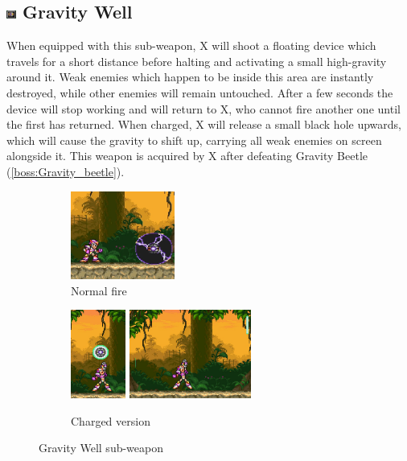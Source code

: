 \subsection{\includegraphics[width=12px, height=10px]{figures/X3/weapons/G_well.jpg} Gravity Well}\label{Gravity_Well}
When equipped with this sub-weapon, X will shoot a floating device which travels for a short distance before halting and activating a small high-gravity around it. Weak enemies which happen to be inside this area are instantly destroyed, while other enemies will remain untouched. After a few seconds the device will stop working and will return to X, who cannot fire another one until the first has returned. When charged, X will release a small black hole upwards, which will cause the gravity to shift up, carrying all weak enemies on screen alongside it. This weapon is acquired by X after defeating Gravity Beetle (\ref{boss:Gravity_beetle}). 
\begin{figure}[htp]
	\centering
	\begin{subfigure}{.28\linewidth}
		\centering
		\includegraphics[height=2.9cm]{figures/X3/weapons/G_well.png}
		\caption{Normal fire}	
	\end{subfigure}
	\begin{subfigure}{.6\linewidth}
		\centering
		\includegraphics[height=2.9cm]{figures/X3/weapons/G_well_C.png}
		\includegraphics[height=2.9cm]{figures/X3/weapons/G_well_C_1.png}
		\caption{Charged version}	
	\end{subfigure}
	\caption{Gravity Well sub-weapon}
\end{figure}

